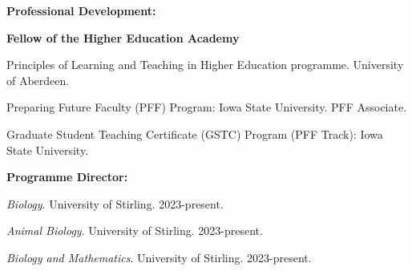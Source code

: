 \documentclass[letterpaper]{article}
\renewenvironment{itemize}{
  \begin{list}{}{
    \setlength{\leftmargin}{1.5em}
  }
}{
  \end{list}
}
\begin{document}
\begin{itemize}
\item {\bf Professional Development:}
\begin{itemize}
\item[$\bullet$]{{\bf Fellow of the Higher Education Academy}}
\item[$\bullet$]{Principles of Learning and Teaching in Higher Education programme. University of Aberdeen.}
\item[$\bullet$]{Preparing Future Faculty (PFF) Program: Iowa State University. PFF Associate.}
\item[$\bullet$]{Graduate Student Teaching Certificate (GSTC) Program (PFF Track): Iowa State University.}
\end{itemize}

\item {\bf Programme Director:}
\begin{itemize}
\item[$\bullet$]{{\it Biology}. University of Stirling. 2023-present.}
\item[$\bullet$]{{\it Animal Biology}. University of Stirling. 2023-present.}
\item[$\bullet$]{{\it Biology and Mathematics}. University of Stirling. 2023-present.}
\end{itemize}


\end{itemize}
\end{document}
